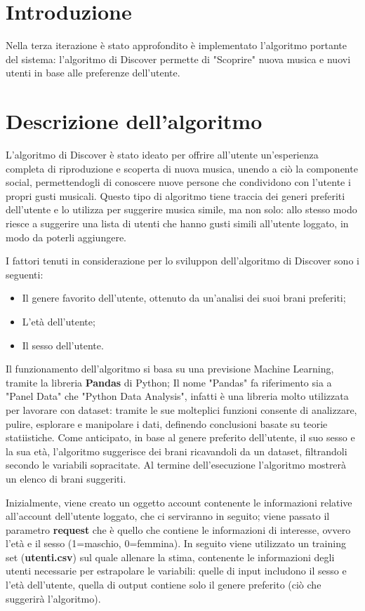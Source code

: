 \section{Introduzione}
Nella terza iterazione è stato approfondito è implementato l'algoritmo portante del sistema: l'algoritmo di Discover permette di "Scoprire" nuova 
musica e nuovi utenti in base alle preferenze dell'utente.


\section{Descrizione dell'algoritmo}
L'algoritmo di Discover è stato ideato per offrire all'utente un'esperienza completa di riproduzione e scoperta di nuova musica, unendo a ciò la 
componente social, permettendogli di conoscere nuove persone che condividono con l'utente i propri gusti musicali. Questo tipo di algoritmo 
tiene traccia dei generi preferiti dell'utente e lo utilizza per suggerire musica simile, ma non solo: allo stesso modo riesce a suggerire 
una lista di utenti che hanno gusti simili all'utente loggato, in modo da poterli aggiungere.  

I fattori tenuti in considerazione per lo sviluppon dell'algoritmo di Discover sono i seguenti: 
\begin{itemize}
    \item Il genere favorito dell'utente, ottenuto da un'analisi dei suoi brani preferiti;
    \item L'età dell'utente;
    \item Il sesso dell'utente.
\end{itemize}

Il funzionamento dell'algoritmo si basa su una previsione Machine Learning, tramite la libreria \textbf{Pandas} di Python;
Il nome "Pandas" fa riferimento sia a "Panel Data" che "Python Data Analysis", infatti è una libreria molto utilizzata per lavorare 
con dataset: tramite le sue molteplici funzioni consente di analizzare, pulire, esplorare e manipolare i dati, definendo 
conclusioni basate su teorie statiistiche. 
Come anticipato, in base al genere preferito dell'utente, il suo sesso e la sua età, l'algoritmo suggerisce dei brani ricavandoli 
da un dataset, filtrandoli secondo le variabili sopracitate. Al termine dell'esecuzione l'algoritmo mostrerà un elenco di brani suggeriti.

Inizialmente, viene creato un oggetto account contenente le informazioni relative all'account dell'utente loggato, che ci serviranno in seguito; 
viene passato il parametro \textbf{request} che è quello che contiene le informazioni di interesse, ovvero l'età e il sesso (1=maschio, 0=femmina). 
In seguito viene utilizzato un training set (\textbf{utenti.csv}) sul quale allenare la stima, contenente le informazioni degli utenti 
necessarie per estrapolare le variabili: quelle di input includono il sesso e l'età dell'utente, quella di output contiene solo 
il genere preferito (ciò che suggerirà l'algoritmo). 

